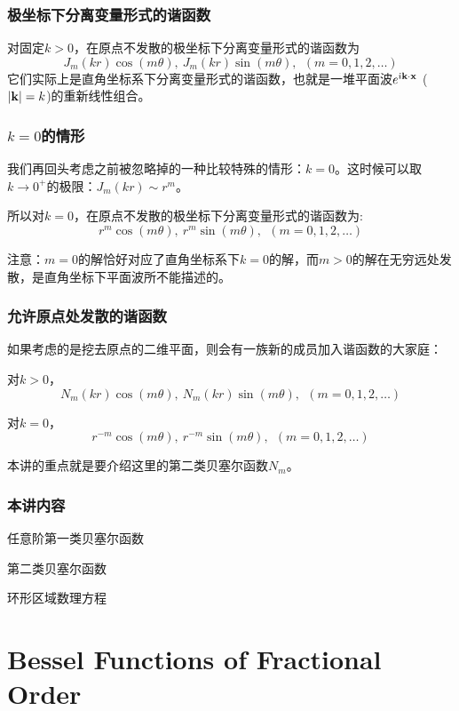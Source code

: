 \documentclass[CJK]{beamer}
\date{}
\begin{document}
  \bch
{}


\begin{frame}
  \frametitle{极坐标下分离变量形式的谐函数}
对固定$k>0$，在原点不发散的极坐标下分离变量形式的谐函数为
$$ J_m(kr)\cos(m\theta), \ J_m(kr)\sin(m\theta), \ \ (m=0,1,2,\ldots) $$
它们实际上是直角坐标系下分离变量形式的谐函数，也就是一堆平面波$e^{{\dot{\imath}} {\mathbf{k}} \cdot {\mathbf{x}}}$ ($|{\mathbf{k}}|=k$)的重新线性组合。
\end{frame}


\begin{frame}
  \frametitle{$k=0$的情形}
  我们再回头考虑之前被忽略掉的一种比较特殊的情形：$k=0$。这时候可以取$k\rightarrow 0^+$的极限：$ J_m(kr)\sim  r^m$。

  所以对$k=0$，在原点不发散的极坐标下分离变量形式的谐函数为:
  $$ r^m \cos(m\theta), \ r^m \sin(m\theta), \ \ (m=0,1,2,\ldots)$$

  {\scriptsize 注意：$m=0$的解恰好对应了直角坐标系下$k=0$的解，而$m>0$的解在无穷远处发散，是直角坐标下平面波所不能描述的。}
\end{frame}


\begin{frame}
  \frametitle{允许原点处发散的谐函数}
  如果考虑的是挖去原点的二维平面，则会有一族新的成员加入谐函数的大家庭：
  \bitem
\item{对$k>0$，
  $$N_m(kr)\cos(m\theta), \ N_m(kr)\sin(m\theta), \ \ (m=0,1,2,\ldots) $$}
\item{对$k=0$，
  $$r^{-m} \cos(m\theta), \ r^{-m} \sin(m\theta), \ \ (m=0,1,2,\ldots)$$}
  \eitem

  本讲的重点就是要介绍这里的第二类贝塞尔函数$N_m$。
\end{frame}


\begin{frame}
\frametitle{本讲内容}

\bitem
\item{任意阶第一类贝塞尔函数}
\item{第二类贝塞尔函数}
\item{环形区域数理方程}
\eitem

\end{frame}

\section{Bessel Functions of Fractional Order}
\end{document}
